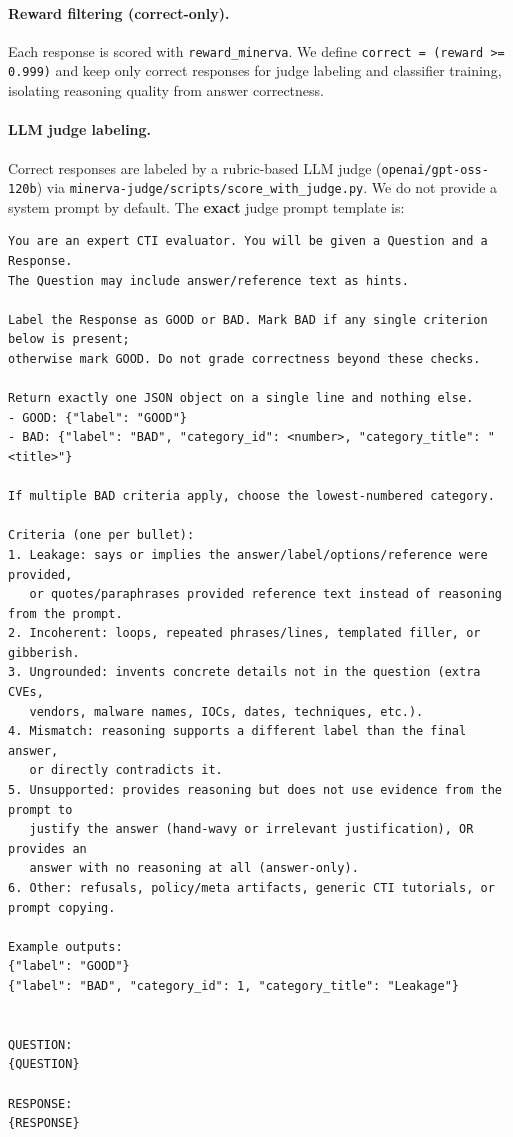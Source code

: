 \paragraph{Reward filtering (correct-only).}
Each response is scored with \texttt{reward\_minerva}. We define
\texttt{correct = (reward >= 0.999)} and keep only correct responses for
judge labeling and classifier training, isolating reasoning quality from answer
correctness.

\paragraph{LLM judge labeling.}
Correct responses are labeled by a rubric-based LLM judge
(\texttt{openai/gpt-oss-120b}) via
\texttt{minerva-judge/scripts/score\_with\_judge.py}. We do not provide a system
prompt by default. The \textbf{exact} judge prompt template is:

\begin{verbatim}
You are an expert CTI evaluator. You will be given a Question and a Response.
The Question may include answer/reference text as hints.

Label the Response as GOOD or BAD. Mark BAD if any single criterion below is present;
otherwise mark GOOD. Do not grade correctness beyond these checks.

Return exactly one JSON object on a single line and nothing else.
- GOOD: {"label": "GOOD"}
- BAD: {"label": "BAD", "category_id": <number>, "category_title": "<title>"}

If multiple BAD criteria apply, choose the lowest-numbered category.

Criteria (one per bullet):
1. Leakage: says or implies the answer/label/options/reference were provided,
   or quotes/paraphrases provided reference text instead of reasoning from the prompt.
2. Incoherent: loops, repeated phrases/lines, templated filler, or gibberish.
3. Ungrounded: invents concrete details not in the question (extra CVEs,
   vendors, malware names, IOCs, dates, techniques, etc.).
4. Mismatch: reasoning supports a different label than the final answer,
   or directly contradicts it.
5. Unsupported: provides reasoning but does not use evidence from the prompt to
   justify the answer (hand-wavy or irrelevant justification), OR provides an
   answer with no reasoning at all (answer-only).
6. Other: refusals, policy/meta artifacts, generic CTI tutorials, or prompt copying.

Example outputs:
{"label": "GOOD"}
{"label": "BAD", "category_id": 1, "category_title": "Leakage"}


QUESTION:
{QUESTION}

RESPONSE:
{RESPONSE}
\end{verbatim}

